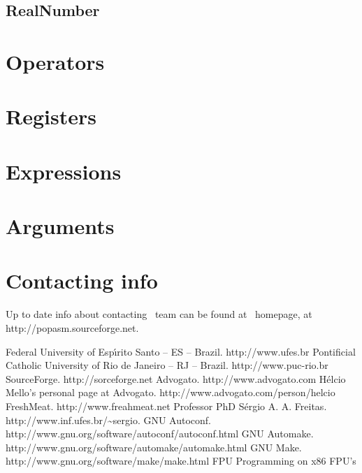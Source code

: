 \documentclass[a4paper,draft,12pt]{book}
\begin{document}
\section{RealNumber\label{secrealnum}}



\chapter{Operators\label{chapops}}

\chapter{Registers\label{chapregs}}

\chapter{Expressions\label{chapexps}}

\chapter{Arguments\label{chapargs}}


\appendix

\chapter{Contacting info\label{CONTACT}}
Up to date info about contacting \popasm\ team can be found at \popasm\
homepage, at http://popasm.sourceforge.net.

\begin{thebibliography}{12}
 Federal University of Esp\'{\i}rito Santo -- ES -- Brazil.
http://www.ufes.br
 Pontificial Catholic University of Rio de Janeiro -- RJ
-- Brazil. http://www.puc-rio.br
 SourceForge. http://sorceforge.net
Advogato. http://www.advogato.com
H\'elcio Mello's personal page at Advogato.
http://www.advogato.com/person/helcio
FreshMeat. http://www.freahmeat.net
Professor PhD S\'ergio A. A. Freitas.
http://www.inf.ufes.br/\~{}sergio.
GNU Autoconf.
http://www.gnu.org/software/autoconf/autoconf.html
GNU Automake.
http://www.gnu.org/software/automake/automake.html
GNU Make. http://www.gnu.org/software/make/make.html
\bibitem{FPUMAN}FPU Programming on x86 FPU's
\end{thebibliography}
\end{document}
